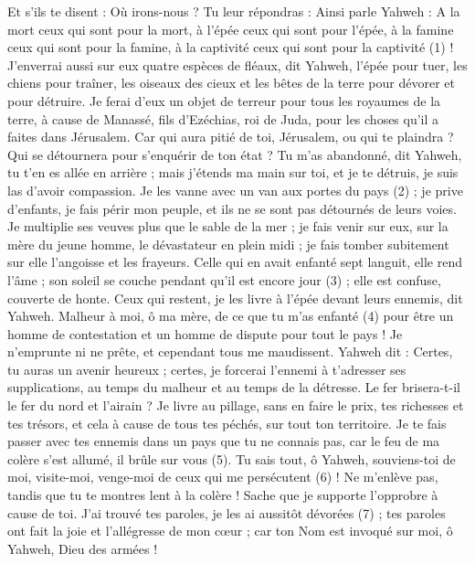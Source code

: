 \begin{multicols}{2}
Et s'ils te disent : Où irons-nous ? Tu leur répondras : Ainsi parle Yahweh : A la mort ceux qui sont pour la mort, à l’épée ceux qui sont pour l’épée, à la famine ceux qui sont pour la famine, à la captivité ceux qui sont pour la captivité\FTNT{} (1) !
J'enverrai aussi sur eux quatre espèces de fléaux, dit Yahweh, l'épée pour tuer, les chiens pour traîner, les oiseaux des cieux et les bêtes de la terre pour dévorer et pour détruire.
Je ferai d’eux un objet de terreur pour tous les royaumes de la terre, à cause de Manassé, fils d'Ezéchias, roi de Juda, pour les choses qu'il a faites dans Jérusalem.
Car qui aura pitié de toi, Jérusalem, ou qui te plaindra ? Qui se détournera pour s'enquérir de ton état ?
Tu m'as abandonné, dit Yahweh, tu t'en es allée en arrière ; mais j'étends ma main sur toi, et je te détruis, je suis las d’avoir compassion.
Je les vanne avec un van aux portes du pays\FTNT{} (2) ; je prive d’enfants, je fais périr mon peuple, et ils ne se sont pas détournés de leurs voies.
Je multiplie ses veuves plus que le sable de la mer ; je fais venir sur eux, sur la mère du jeune homme, le dévastateur en plein midi ; je fais tomber subitement sur elle l'angoisse et les frayeurs.
Celle qui en avait enfanté sept languit, elle rend l'âme ; son soleil se couche pendant qu'il est encore jour\FTNT{} (3) ; elle est confuse, couverte de honte. Ceux qui restent, je les livre à l'épée devant leurs ennemis, dit Yahweh.
Malheur à moi, ô ma mère, de ce que tu m'as enfanté\FTNT{} (4) pour être un homme de contestation et un homme de dispute pour tout le pays ! Je n’emprunte ni ne prête, et cependant tous me maudissent.
Yahweh dit : Certes, tu auras un avenir heureux ; certes, je forcerai l’ennemi à t’adresser ses supplications, au temps du malheur et au temps de la détresse.
Le fer brisera-t-il le fer du nord et l'airain ?
Je livre au pillage, sans en faire le prix, tes richesses et tes trésors, et cela à cause de tous tes péchés, sur tout ton territoire.
Je te fais passer avec tes ennemis dans un pays que tu ne connais pas, car le feu de ma colère s’est allumé, il brûle sur vous\FTNT{}  (5).
Tu sais tout, ô Yahweh, souviens-toi de moi, visite-moi, venge-moi de ceux qui me persécutent\FTNT{} (6) ! Ne m'enlève pas, tandis que tu te montres lent à la colère ! Sache que je supporte l’opprobre à cause de toi.
J’ai trouvé tes paroles, je les ai aussitôt dévorées\FTNT{} (7) ; tes paroles ont fait la joie et l’allégresse de mon cœur ; car ton Nom est invoqué sur moi, ô Yahweh, Dieu des armées !

\end{multicols}

